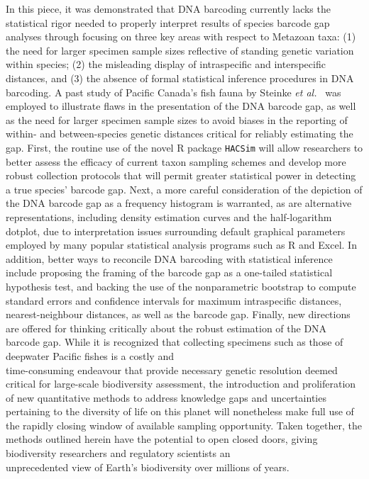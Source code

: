 In this piece, it was demonstrated that DNA barcoding currently lacks the \\ statistical rigor needed to properly interpret results of species barcode gap analyses through focusing on three key areas with respect to Metazoan taxa: (1) the need for larger specimen sample sizes reflective of standing genetic variation within species; (2) the misleading display of intraspecific and interspecific distances, and (3) the absence of formal statistical inference procedures in DNA barcoding. A past study of Pacific Canada's fish fauna by Steinke \textit{et al.}~ \cite{steinke2009dna} was employed to illustrate flaws in the presentation of the DNA barcode gap, as well as the need for larger specimen sample sizes to avoid biases in the reporting of within- and between-species genetic distances critical for reliably estimating the gap. First, the routine use of the novel R package {\tt HACSim} will allow researchers to better assess the efficacy of current taxon sampling schemes and develop more robust collection protocols that will permit greater statistical power in detecting a true species' barcode gap. Next, a more careful consideration of the depiction of the DNA barcode gap as a frequency histogram is warranted, as are alternative representations, including density estimation curves and the half-logarithm dotplot, due to interpretation issues surrounding default graphical parameters employed by many popular statistical analysis programs such as R and Excel. In addition, better ways to reconcile DNA barcoding with statistical inference include proposing the framing of the barcode gap as a one-tailed statistical \\ hypothesis test, and backing the use of the nonparametric bootstrap to compute standard errors and confidence intervals for maximum intraspecific distances, nearest-neighbour distances, as well as the barcode gap. Finally, new directions are offered for thinking critically about the robust estimation of the DNA barcode gap. While it is recognized that collecting specimens such as those of deepwater Pacific fishes is a costly and \\ time-consuming endeavour that  provide necessary genetic resolution deemed critical for large-scale biodiversity assessment, the introduction and proliferation of new quantitative methods to address knowledge gaps and uncertainties pertaining to the diversity of life on this planet will nonetheless make full use of the rapidly closing window of available sampling opportunity. Taken together, the methods outlined herein have the potential to open closed doors, giving biodiversity researchers and regulatory scientists an \\ unprecedented view of Earth's biodiversity over millions of years.



